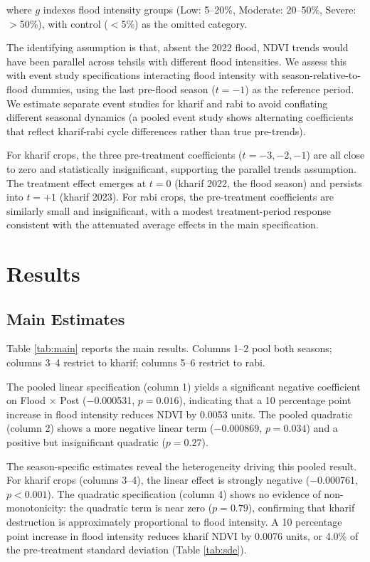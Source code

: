 \documentclass[12pt]{article}
\begin{document}
\noindent where $g$ indexes flood intensity groups (Low: 5--20\%, Moderate: 20--50\%, Severe: $>$50\%), with control ($<$5\%) as the omitted category.

The identifying assumption is that, absent the 2022 flood, NDVI trends would have been parallel across tehsils with different flood intensities. We assess this with event study specifications interacting flood intensity with season-relative-to-flood dummies, using the last pre-flood season ($t = -1$) as the reference period. We estimate separate event studies for kharif and rabi to avoid conflating different seasonal dynamics (a pooled event study shows alternating coefficients that reflect kharif-rabi cycle differences rather than true pre-trends).

For kharif crops, the three pre-treatment coefficients ($t = -3, -2, -1$) are all close to zero and statistically insignificant, supporting the parallel trends assumption. The treatment effect emerges at $t = 0$ (kharif 2022, the flood season) and persists into $t = +1$ (kharif 2023). For rabi crops, the pre-treatment coefficients are similarly small and insignificant, with a modest treatment-period response consistent with the attenuated average effects in the main specification.

\section{Results}\label{sec:results}

\subsection{Main Estimates}

Table \ref{tab:main} reports the main results. Columns 1--2 pool both seasons; columns 3--4 restrict to kharif; columns 5--6 restrict to rabi.

The pooled linear specification (column 1) yields a significant negative coefficient on Flood $\times$ Post ($-$0.000531, $p = 0.016$), indicating that a 10 percentage point increase in flood intensity reduces NDVI by 0.0053 units. The pooled quadratic (column 2) shows a more negative linear term ($-$0.000869, $p = 0.034$) and a positive but insignificant quadratic ($p = 0.27$).

The season-specific estimates reveal the heterogeneity driving this pooled result. For kharif crops (columns 3--4), the linear effect is strongly negative ($-$0.000761, $p < 0.001$). The quadratic specification (column 4) shows no evidence of non-monotonicity: the quadratic term is near zero ($p = 0.79$), confirming that kharif destruction is approximately proportional to flood intensity. A 10 percentage point increase in flood intensity reduces kharif NDVI by 0.0076 units, or 4.0\% of the pre-treatment standard deviation (Table \ref{tab:sde}).
\end{document}
